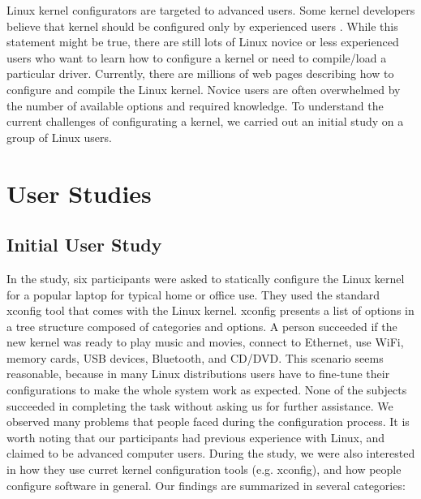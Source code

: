 \documentclass{chi2009}
\begin{document}
Linux kernel configurators are targeted to advanced users. Some kernel developers believe that kernel should be configured only by experienced users
\cite{kernel:aunt:2002}. While this statement might be true, there are still lots of Linux novice or less experienced users who want to learn how to configure a
kernel or need to compile/load a particular driver. Currently, there are millions of web pages describing how to configure and compile the Linux kernel. Novice
users are often overwhelmed by the number of available options and required knowledge. To understand the current challenges of configurating a kernel, we
carried out an initial study on a group of Linux users.

\section{User Studies}\label{sec:userstudies}

\subsection{Initial User Study}
In the study, six participants were asked to statically configure the Linux kernel for a popular laptop for typical home or office use. They used the standard
\textsf{xconfig} tool that comes with the Linux kernel. \textsf{xconfig} presents a list of options in a tree structure composed of categories and options. A
person succeeded if the new kernel was ready to play music and movies, connect to Ethernet, use WiFi, memory cards, USB devices, Bluetooth, and CD/DVD. This
scenario seems reasonable, because in many Linux distributions users have to fine-tune their configurations to make the whole system work as expected. None
of the subjects succeeded in completing the task without asking us for further assistance. We observed many problems that people faced during the configuration
process. It is worth noting that our participants had previous experience with Linux, and claimed to be advanced computer users. During the study, we were also
interested in how they use curret kernel configuration tools (e.g. \textsf{xconfig}), and how people configure software in general. Our findings are summarized
in several categories:
\end{document}
